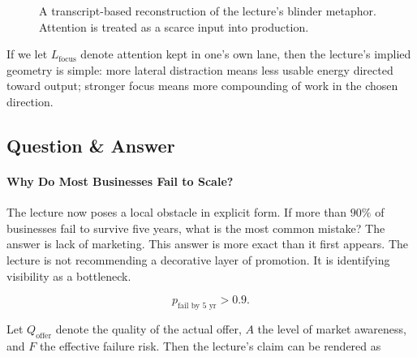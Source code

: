 \begin{figure}[h]
\centering
{}
\caption{A transcript-based reconstruction of the lecture's blinder metaphor. Attention is treated as a scarce input into production.}
\end{figure}

If we let \(L_{\text{focus}}\) denote attention kept in one's own lane, then the lecture's implied geometry is simple: more lateral distraction means less usable energy directed toward output; stronger focus means more compounding of work in the chosen direction.

\subsection{Question \& Answer}

\paragraph{Why Do Most Businesses Fail to Scale?}

The lecture now poses a local obstacle in explicit form. If more than \(90\%\) of businesses fail to survive five years, what is the most common mistake? The answer is lack of marketing. This answer is more exact than it first appears. The lecture is not recommending a decorative layer of promotion. It is identifying visibility as a bottleneck.

\begin{equation}
p_{\text{fail by 5 yr}} > 0.9.
\end{equation}

Let \(Q_{\text{offer}}\) denote the quality of the actual offer, \(A\) the level of market awareness, and \(F\) the effective failure risk. Then the lecture's claim can be rendered as

